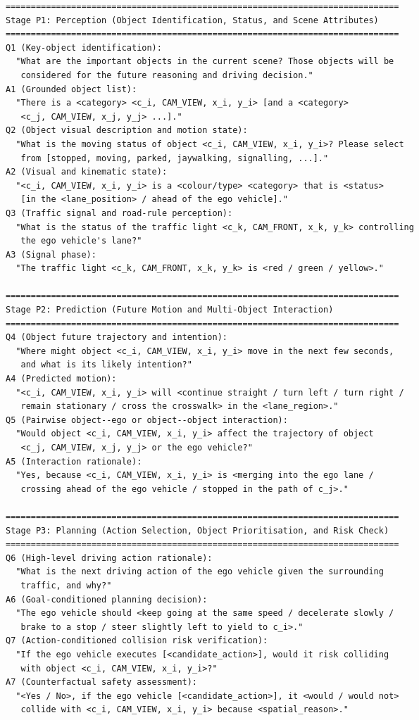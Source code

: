 \begin{footnotesize}
\begin{spacing}{1.15}
\begin{verbatim}
==============================================================================
Stage P1: Perception (Object Identification, Status, and Scene Attributes)
==============================================================================
Q1 (Key-object identification):
  "What are the important objects in the current scene? Those objects will be
   considered for the future reasoning and driving decision."
A1 (Grounded object list):
  "There is a <category> <c_i, CAM_VIEW, x_i, y_i> [and a <category>
   <c_j, CAM_VIEW, x_j, y_j> ...]."
Q2 (Object visual description and motion state):
  "What is the moving status of object <c_i, CAM_VIEW, x_i, y_i>? Please select
   from [stopped, moving, parked, jaywalking, signalling, ...]."
A2 (Visual and kinematic state):
  "<c_i, CAM_VIEW, x_i, y_i> is a <colour/type> <category> that is <status>
   [in the <lane_position> / ahead of the ego vehicle]."
Q3 (Traffic signal and road-rule perception):
  "What is the status of the traffic light <c_k, CAM_FRONT, x_k, y_k> controlling
   the ego vehicle's lane?"
A3 (Signal phase):
  "The traffic light <c_k, CAM_FRONT, x_k, y_k> is <red / green / yellow>."

==============================================================================
Stage P2: Prediction (Future Motion and Multi-Object Interaction)
==============================================================================
Q4 (Object future trajectory and intention):
  "Where might object <c_i, CAM_VIEW, x_i, y_i> move in the next few seconds,
   and what is its likely intention?"
A4 (Predicted motion):
  "<c_i, CAM_VIEW, x_i, y_i> will <continue straight / turn left / turn right /
   remain stationary / cross the crosswalk> in the <lane_region>."
Q5 (Pairwise object--ego or object--object interaction):
  "Would object <c_i, CAM_VIEW, x_i, y_i> affect the trajectory of object
   <c_j, CAM_VIEW, x_j, y_j> or the ego vehicle?"
A5 (Interaction rationale):
  "Yes, because <c_i, CAM_VIEW, x_i, y_i> is <merging into the ego lane /
   crossing ahead of the ego vehicle / stopped in the path of c_j>."

==============================================================================
Stage P3: Planning (Action Selection, Object Prioritisation, and Risk Check)
==============================================================================
Q6 (High-level driving action rationale):
  "What is the next driving action of the ego vehicle given the surrounding
   traffic, and why?"
A6 (Goal-conditioned planning decision):
  "The ego vehicle should <keep going at the same speed / decelerate slowly /
   brake to a stop / steer slightly left to yield to c_i>."
Q7 (Action-conditioned collision risk verification):
  "If the ego vehicle executes [<candidate_action>], would it risk colliding
   with object <c_i, CAM_VIEW, x_i, y_i>?"
A7 (Counterfactual safety assessment):
  "<Yes / No>, if the ego vehicle [<candidate_action>], it <would / would not>
   collide with <c_i, CAM_VIEW, x_i, y_i> because <spatial_reason>."


\end{verbatim}
\end{spacing}
\end{footnotesize}
